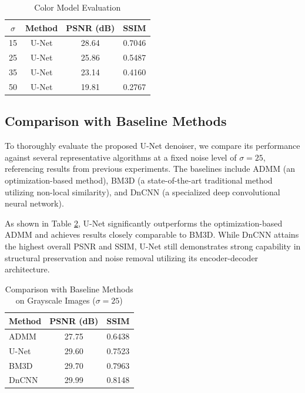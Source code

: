 \documentclass[conference]{IEEEtran}
\begin{document}
\begin{table}[htbp]
\caption{Color Model Evaluation}
\begin{center}
\begin{tabular}{cccc}
\toprule
\textbf{$\sigma$} & \textbf{Method} & \textbf{PSNR (dB)} & \textbf{SSIM} \\
\midrule
15 & U-Net & 28.64 & 0.7046 \\
25 & U-Net & 25.86 & 0.5487 \\
35 & U-Net & 23.14 & 0.4160 \\
50 & U-Net & 19.81 & 0.2767 \\
\bottomrule
\end{tabular}
\label{tab:color}
\end{center}
\end{table}

\subsection{Comparison with Baseline Methods}
To thoroughly evaluate the proposed U-Net denoiser, we compare its performance against several representative algorithms at a fixed noise level of $\sigma=25$, referencing results from previous experiments. The baselines include ADMM (an optimization-based method), BM3D (a state-of-the-art traditional method utilizing non-local similarity), and DnCNN (a specialized deep convolutional neural network). 

As shown in Table \ref{tab:comparison}, U-Net significantly outperforms the optimization-based ADMM and achieves results closely comparable to BM3D. While DnCNN attains the highest overall PSNR and SSIM, U-Net still demonstrates strong capability in structural preservation and noise removal utilizing its encoder-decoder architecture.

\begin{table}[htbp]
\caption{Comparison with Baseline Methods on Grayscale Images ($\sigma=25$)}
\begin{center}
\begin{tabular}{lcc}
\toprule
\textbf{Method} & \textbf{PSNR (dB)} & \textbf{SSIM} \\
\midrule
ADMM & 27.75 & 0.6438 \\
U-Net & 29.60 & 0.7523 \\
BM3D & 29.70 & 0.7963 \\
DnCNN & 29.99 & 0.8148 \\
\bottomrule
\end{tabular}
\label{tab:comparison}
\end{center}
\end{table}
\end{document}
